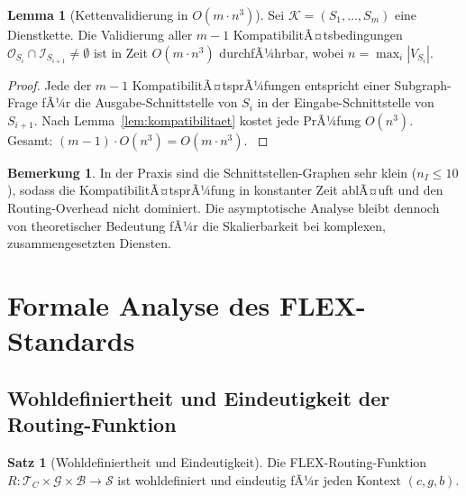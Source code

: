 ﻿\documentclass[a4paper,12pt]{article}
\theoremstyle{definition}
\newtheorem{satz}{Satz}
\newtheorem{lemma}{Lemma}
\newtheorem{bemerkung}{Bemerkung}
\begin{document}
\begin{lemma}[Kettenvalidierung in $O(m \cdot n^3)$]
\label{lem:kettenvalidierung}
Sei $\mathcal{K} = (S_1, \ldots, S_m)$ eine Dienstkette. Die Validierung aller $m-1$ KompatibilitÃ¤tsbedingungen $\mathcal{O}_{S_i} \cap \mathcal{I}_{S_{i+1}} \neq \emptyset$ ist in Zeit $O(m \cdot n^3)$ durchfÃ¼hrbar, wobei $n = \max_i |V_{S_i}|$.
\end{lemma}

\begin{proof}
Jede der $m-1$ KompatibilitÃ¤tsprÃ¼fungen entspricht einer Subgraph-Frage fÃ¼r die Ausgabe-Schnittstelle von $S_i$ in der Eingabe-Schnittstelle von $S_{i+1}$. Nach Lemma~\ref{lem:kompatibilitaet} kostet jede PrÃ¼fung $O(n^3)$. Gesamt: $(m-1) \cdot O(n^3) = O(m \cdot n^3)$. $
$
\end{proof}

\begin{bemerkung}
In der Praxis sind die Schnittstellen-Graphen sehr klein ($n_I \leq 10$), sodass die KompatibilitÃ¤tsprÃ¼fung in konstanter Zeit ablÃ¤uft und den Routing-Overhead nicht dominiert. Die asymptotische Analyse bleibt dennoch von theoretischer Bedeutung fÃ¼r die Skalierbarkeit bei komplexen, zusammengesetzten Diensten.
\end{bemerkung}

\section{Formale Analyse des FLEX-Standards}
\label{sec:analyse}

\subsection{Wohldefiniertheit und Eindeutigkeit der Routing-Funktion}

\begin{satz}[Wohldefiniertheit und Eindeutigkeit]
\label{satz:eindeutigkeit}
Die FLEX-Routing-Funktion $R: \mathcal{T}_C \times \mathcal{G} \times \mathcal{B} \to \mathcal{S}$ ist wohldefiniert und eindeutig fÃ¼r jeden Kontext $(c, g, b)$.
\end{satz}
\end{document}
